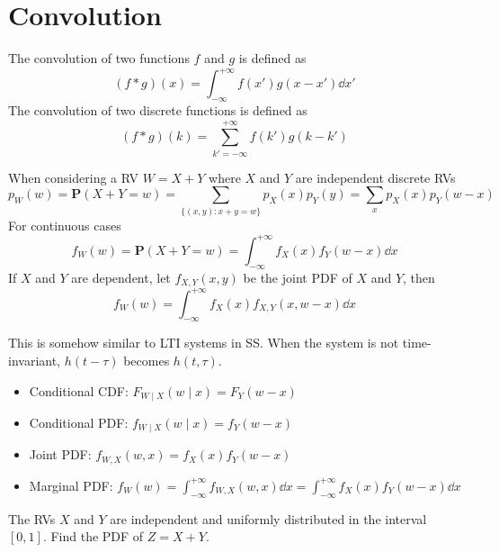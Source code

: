 \documentclass[device=normal, lang=en]{elegantbook}
\numberwithin{equation}{section}
\begin{document}
\section{Convolution}
\begin{definition}[Convolution]
    The convolution of two functions $f$ and $g$ is defined as
    \begin{equation}
        (f * g)(x) = \int_{-\infty}^{+\infty} f(x') g(x - x') \dd{x'}
    \end{equation}
    The convolution of two discrete functions is defined as
    \begin{equation}
        (f * g)(k) = \sum_{k' = -\infty}^{+\infty} f(k') g(k - k')
    \end{equation}
\end{definition}
When considering a RV $W = X + Y$ where $X$ and $Y$ are independent discrete RVs
\begin{equation}
    p_{W}(w) = \mathbf{P}(X + Y = w) = \sum_{\{(x, y): x + y = w\}} p_{X}(x) p_{Y}(y) = \sum_{x} p_{X}(x) p_{Y}(w - x)
\end{equation}
For continuous cases
\begin{equation}
    f_{W}(w) = \mathbf{P}(X + Y = w) = \int_{-\infty}^{+\infty} f_{X}(x) f_{Y}(w - x) \dd{x}
\end{equation}
If $X$ and $Y$ are dependent, let $f_{X, Y}(x, y)$ be the joint PDF of $X$ and $Y$, then
\begin{equation}
    f_{W}(w) = \int_{-\infty}^{+\infty} f_{X}(x) f_{X, Y}(x, w - x) \dd{x}
\end{equation}
\begin{remark}
    This is somehow similar to LTI systems in SS. When the system is not time-invariant, $h(t - \tau)$ becomes $h(t, \tau)$.
\end{remark}
\begin{remark}
    \begin{itemize}
    \item Conditional CDF: $F_{W \mid X}(w \mid x) = F_{Y}(w - x)$
    \item Conditional PDF: $f_{W \mid X}(w \mid x) = f_{Y}(w - x)$
    \item Joint PDF: $f_{W, X}(w, x) = f_{X}(x) f_{Y}(w - x)$
    \item Marginal PDF: $f_{W}(w) = \int_{-\infty}^{+\infty} f_{W, X}(w, x) \dd{x} = \int_{-\infty}^{+\infty} f_{X}(x) f_{Y}(w - x) \dd{x}$
    \end{itemize}
\end{remark}
\begin{example}
    The RVs $X$ and $Y$ are independent and uniformly distributed in the interval $[0, 1]$. Find the PDF of $Z = X +Y$.
\end{example}
\end{document}
